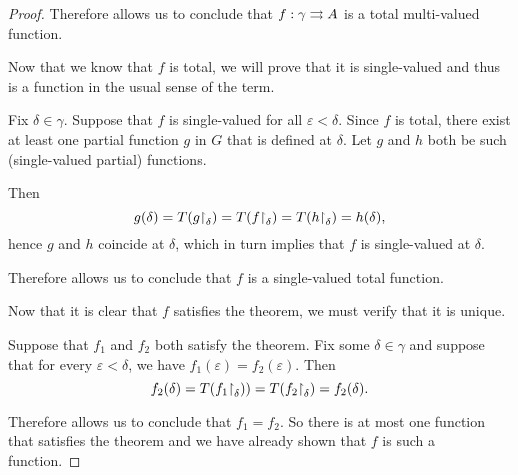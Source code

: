 \begin{proof}
  Therefore  allows us to conclude that \( f: \gamma \rightrightarrows A \) is a total multi-valued function.

   Now that we know that \( f \) is total, we will prove that it is single-valued and thus is a function in the usual sense of the term.

  Fix \( \delta \in \gamma \). Suppose that \( f \) is single-valued for all \( \varepsilon < \delta \). Since \( f \) is total, there exist at least one partial function \( g \) in \( G \) that is defined at \( \delta \). Let \( g \) and \( h \) both be such (single-valued partial) functions.

  Then
  \begin{equation*}
    g(\delta) = T(g{\upharpoonright}_\delta) = T(f{\upharpoonright}_\delta) = T(h{\upharpoonright}_\delta) = h(\delta),
  \end{equation*}
  hence \( g \) and \( h \) coincide at \( \delta \), which in turn implies that \( f \) is single-valued at \( \delta \).

  Therefore  allows us to conclude that \( f \) is a single-valued total function.

   Now that it is clear that \( f \) satisfies the theorem, we must verify that it is unique.

  Suppose that \( f_1 \) and \( f_2 \) both satisfy the theorem. Fix some \( \delta \in \gamma \) and suppose that for every \( \varepsilon < \delta \), we have \( f_1(\varepsilon) = f_2(\varepsilon) \). Then
  \begin{equation*}
    f_2(\delta) = T(f_1{\upharpoonright}_\delta)) = T(f_2{\upharpoonright}_\delta) = f_2(\delta).
  \end{equation*}

  Therefore  allows us to conclude that \( f_1 = f_2 \). So there is at most one function that satisfies the theorem and we have already shown that \( f \) is such a function.
\end{proof}

